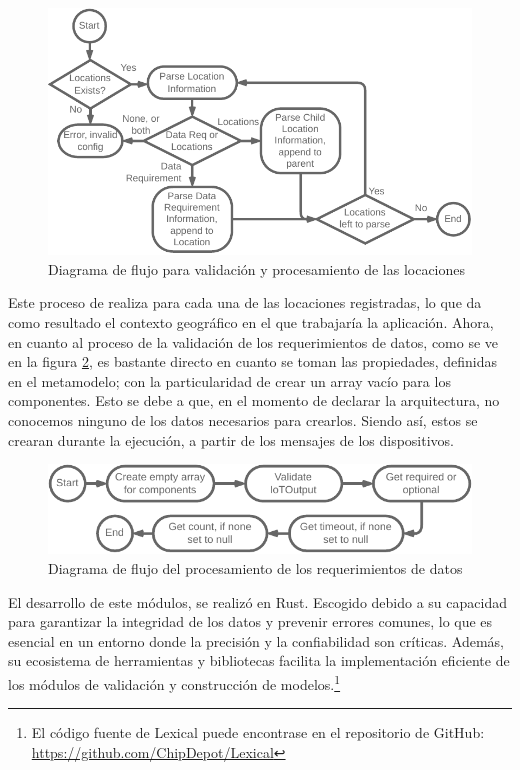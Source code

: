 \begin{figure}[ht]
    \centering
    \caption{Diagrama de flujo para validación y procesamiento de las locaciones}
    \label{fig:LexicalLocations}
    \includegraphics[width=\linewidth]{images/LexicalLocationsFlow.pdf}
\end{figure}


Este proceso de realiza para cada una de las locaciones registradas, lo que da como resultado el contexto geográfico en el que trabajaría la aplicación. Ahora, en cuanto al proceso de la validación de los requerimientos de datos, como se ve en la figura \ref{fig:LexicalDataReq}, es bastante directo en cuanto se toman las propiedades, definidas en el metamodelo; con la particularidad de crear un array vacío para los componentes. Esto se debe a que, en el momento de declarar la arquitectura, no conocemos ninguno de los datos necesarios para crearlos. Siendo así, estos se crearan durante la ejecución, a partir de los mensajes de los dispositivos.

\begin{figure}[ht]
    \centering
    \caption{Diagrama de flujo del procesamiento de los requerimientos de datos}
    \label{fig:LexicalDataReq}
    \includegraphics[width=0.9\linewidth]{images/LexicalDataRqeFlow.pdf}
\end{figure}

El desarrollo de este módulos, se realizó en Rust. Escogido debido a su capacidad para garantizar la integridad de los datos y prevenir errores comunes, lo que es esencial en un entorno donde la precisión y la confiabilidad son críticas. Además, su ecosistema de herramientas y bibliotecas facilita la implementación eficiente de los módulos de validación y construcción de modelos.\footnote{El código fuente de Lexical puede encontrase en el repositorio de GitHub: \url{https://github.com/ChipDepot/Lexical}}

